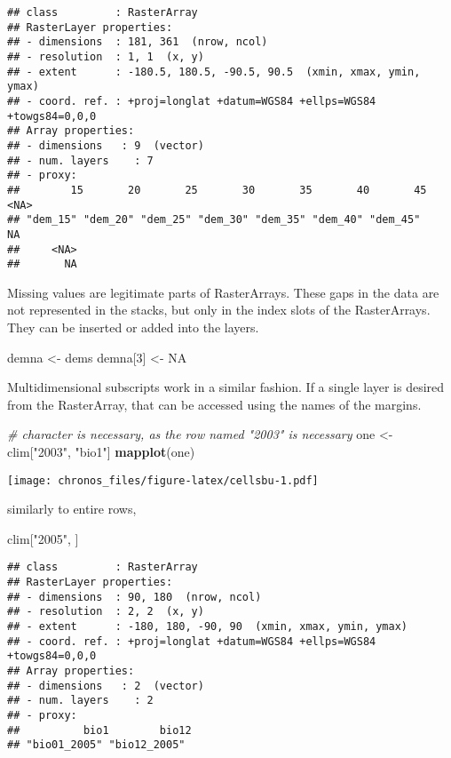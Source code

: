 \documentclass[]{article}
\newenvironment{Shaded}{\begin{snugshade}}{\end{snugshade}}
\newcommand{\KeywordTok}[1]{\textcolor[rgb]{0.13,0.29,0.53}{\textbf{#1}}}
\newcommand{\DecValTok}[1]{\textcolor[rgb]{0.00,0.00,0.81}{#1}}
\newcommand{\StringTok}[1]{\textcolor[rgb]{0.31,0.60,0.02}{#1}}
\newcommand{\CommentTok}[1]{\textcolor[rgb]{0.56,0.35,0.01}{\textit{#1}}}
\newcommand{\OtherTok}[1]{\textcolor[rgb]{0.56,0.35,0.01}{#1}}
\newcommand{\NormalTok}[1]{#1}
\begin{document}
\begin{verbatim}
## class         : RasterArray 
## RasterLayer properties: 
## - dimensions  : 181, 361  (nrow, ncol)
## - resolution  : 1, 1  (x, y)
## - extent      : -180.5, 180.5, -90.5, 90.5  (xmin, xmax, ymin, ymax)
## - coord. ref. : +proj=longlat +datum=WGS84 +ellps=WGS84 +towgs84=0,0,0 
## Array properties: 
## - dimensions   : 9  (vector)
## - num. layers    : 7
## - proxy:
##        15       20       25       30       35       40       45     <NA> 
## "dem_15" "dem_20" "dem_25" "dem_30" "dem_35" "dem_40" "dem_45"       NA 
##     <NA> 
##       NA
\end{verbatim}

Missing values are legitimate parts of RasterArrays. These gaps in the
data are not represented in the stacks, but only in the index slots of
the RasterArrays. They can be inserted or added into the layers.

\begin{Shaded}
\begin{Highlighting}[]
\NormalTok{demna <-}\StringTok{ }\NormalTok{dems}
\NormalTok{demna[}\DecValTok{3}\NormalTok{] <-}\StringTok{ }\OtherTok{NA}
\end{Highlighting}
\end{Shaded}

Multidimensional subscripts work in a similar fashion. If a single layer
is desired from the RasterArray, that can be accessed using the names of
the margins.

\begin{Shaded}
\begin{Highlighting}[]
\CommentTok{# character is necessary, as the row named "2003" is necessary}
\NormalTok{one <-}\StringTok{ }\NormalTok{clim[}\StringTok{"2003"}\NormalTok{, }\StringTok{"bio1"}\NormalTok{]}
\KeywordTok{mapplot}\NormalTok{(one)}
\end{Highlighting}
\end{Shaded}

\texttt{[image: chronos\_files/figure-latex/cellsbu-1.pdf]}

similarly to entire rows,

\begin{Shaded}
\begin{Highlighting}[]
\NormalTok{clim[}\StringTok{"2005"}\NormalTok{, ]}
\end{Highlighting}
\end{Shaded}

\begin{verbatim}
## class         : RasterArray 
## RasterLayer properties: 
## - dimensions  : 90, 180  (nrow, ncol)
## - resolution  : 2, 2  (x, y)
## - extent      : -180, 180, -90, 90  (xmin, xmax, ymin, ymax)
## - coord. ref. : +proj=longlat +datum=WGS84 +ellps=WGS84 +towgs84=0,0,0 
## Array properties: 
## - dimensions   : 2  (vector)
## - num. layers    : 2
## - proxy:
##          bio1        bio12 
## "bio01_2005" "bio12_2005"
\end{verbatim}
\end{document}
